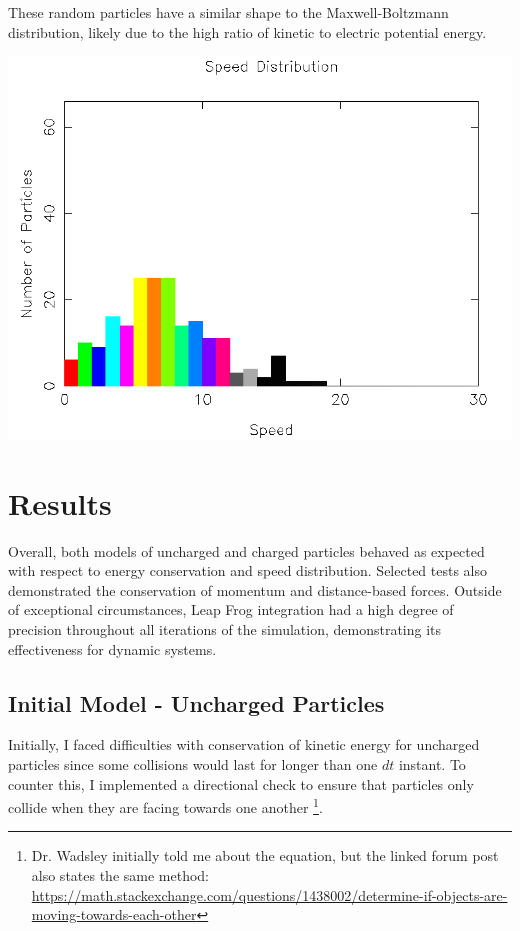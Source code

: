\documentclass{article}
\begin{document}
These random particles have a similar shape to the Maxwell-Boltzmann distribution,
likely due to the high ratio of kinetic to electric potential energy.
\\
\begin{center}
    \includegraphics[scale=0.5]{charged_random_dist}
\end{center}


\section{Results}
Overall, both models of uncharged and charged particles behaved as expected
with respect to energy conservation and speed distribution.
Selected tests also demonstrated the conservation of momentum and distance-based forces.
Outside of exceptional circumstances, Leap Frog integration had a high degree of precision throughout all iterations of the simulation,
demonstrating its effectiveness for dynamic systems.

\subsection{Initial Model - Uncharged Particles}
Initially, I faced difficulties with conservation of kinetic energy for uncharged particles
since some collisions would last for longer than one $dt$ instant.
To counter this, I implemented a directional check to ensure that particles only
collide when they are facing towards one another
\footnote{Dr. Wadsley initially told me about the equation, but the linked forum post also states the same method:
\url{https://math.stackexchange.com/questions/1438002/determine-if-objects-are-moving-towards-each-other}}.
\end{document}
